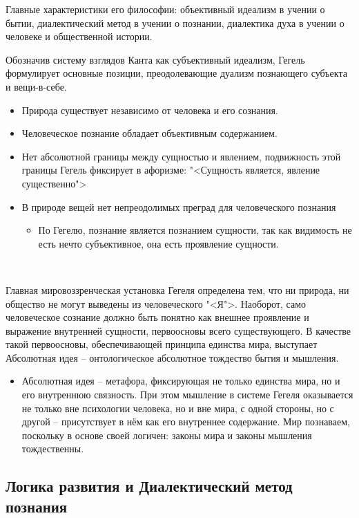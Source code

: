 \documentclass[main.tex]{subfiles}
\begin{document}
{\parindent0pt
Главные характеристики его философии: объективный идеализм в учении о бытии, диалектический метод в учении о познании, диалектика духа в учении о человеке и общественной истории.
}
\ \\

{\parindent0pt
Обозначив систему взглядов Канта как субъективный идеализм, Гегель формулирует основные позиции, преодолевающие дуализм познающего субъекта и вещи-в-себе.
\begin{itemize}[nosep,leftmargin=0.5cm]
\item Природа существует независимо от человека и его сознания.
\item Человеческое познание обладает объективным содержанием.
\item Нет абсолютной границы между сущностью и явлением, подвижность этой границы Гегель фиксирует в афоризме: "<Сущность является, явление существенно">
\item В природе вещей нет непреодолимых преград для человеческого познания
\begin{itemize}[nosep,leftmargin=0.6cm]
\item По Гегелю, познание является познанием сущности, так как видимость не есть нечто субъективное, она есть проявление сущности.
\end{itemize}
\end{itemize}
}
\ 

{\parindent0pt
Главная мировоззренческая установка Гегеля определена тем, что ни природа, ни общество не могут выведены из человеческого "<Я">.
Наоборот, само человеческое сознание должно быть понятно как внешнее проявление и выражение внутренней сущности, первоосновы всего существующего.
В качестве такой первоосновы, обеспечивающей принципа единства мира, выступает Абсолютная идея -- онтологическое абсолютное тождество бытия и мышления.
\begin{itemize}[nosep,leftmargin=0.5cm]
\item Абсолютная идея -- метафора, фиксирующая не только единства мира, но и его внутреннюю связность.
При этом мышление в системе Гегеля оказывается не только вне психологии человека, но и вне мира, с одной стороны, но с другой -- присутствует в нём как его внутреннее содержание.
Мир познаваем, поскольку в основе своей логичен: законы мира и законы мышления тождественны.
\end{itemize}
}



\subsection{Логика развития и Диалектический метод познания}
\end{document}
